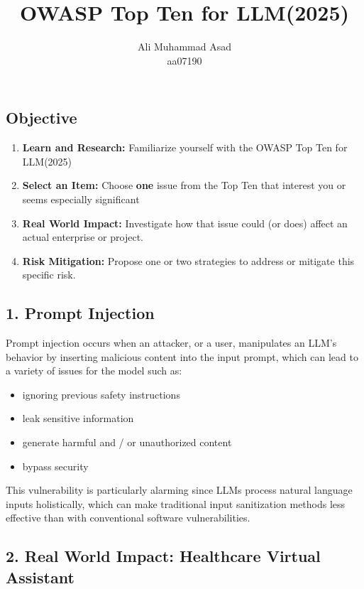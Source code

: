\documentclass{article}
\title{OWASP Top Ten for LLM(2025)}
\author{Ali Muhammad Asad \\ aa07190}
\date{} %
\theoremstyle{mytheoremstyle}
\theoremstyle{mytheoremstyle}
\theoremstyle{myproblemstyle}
\begin{document}
    \maketitle
    
\begin{mdframed}[backgroundcolor=shallowGreen]
\subsection*{Objective}
\begin{enumerate}
    \item \textbf{Learn and Research:} Familiarize yourself with the OWASP Top Ten for LLM(2025) 
    \item \textbf{Select an Item:} Choose \textbf{one} issue from the Top Ten that interest you or seems especially significant
    \item \textbf{Real World Impact:} Investigate how that issue could (or does) affect an actual enterprise or project. 
    \item \textbf{Risk Mitigation:} Propose one or two strategies to address or mitigate this specific risk.
\end{enumerate}
\end{mdframed}

\subsection*{1. Prompt Injection}

Prompt injection occurs when an attacker, or a user, manipulates an LLM's behavior by inserting malicious content into the input prompt, which can lead to a variety of issues for the model such as:
\begin{itemize}
    \item ignoring previous safety instructions
    \item leak sensitive information
    \item generate harmful and / or unauthorized content
    \item bypass security
\end{itemize}

This vulnerability is particularly alarming since LLMs process natural language inputs holistically, which can make traditional input sanitization methods less effective than with conventional software vulnerabilities. 

\subsection*{2. Real World Impact: Healthcare Virtual Assistant}
\end{document}
